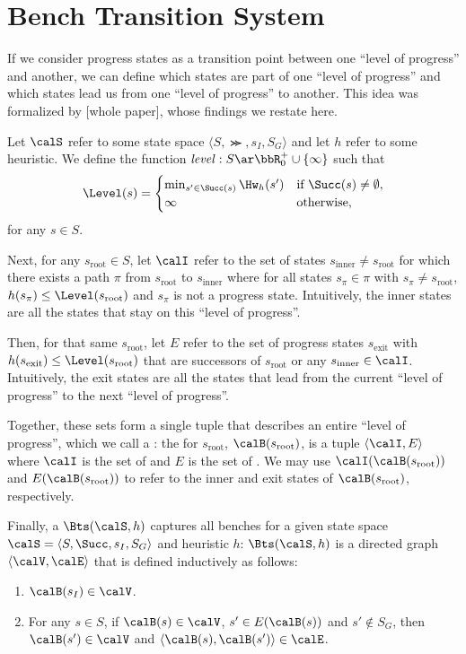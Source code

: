 \section{Bench Transition System}

If we consider progress states as a transition point between one ``level of progress'' and another, we can define which states are part of one ``level of progress'' and which states lead us from one ``level of progress'' to another. This idea was formalized by [whole paper], whose findings we restate here.

Let $\calS$ refer to some state space $\langle S,\Succ,s_I,S_G\rangle$ and let $h$ refer to some heuristic. We define the function $\mathit{level}:S\ar\bbR_0^+\cup\{\infty\}$ such that $$\Level(s)=\begin{cases}\min_{s'\in\Succ(s)}\Hw_h(s')&\text{if }\Succ(s)\neq\emptyset,\\\infty&\text{otherwise,}\end{cases}$$ for any $s\in S$.

Next, for any $s_\text{root}\in S$, let $\calI$ refer to the set of states $s_\text{inner}\neq s_\text{root}$ for which there exists a path $\pi$ from $s_\text{root}$ to $s_\text{inner}$ where for all states $s_\pi\in\pi$ with $s_\pi\neq s_\text{root}$, $h(s_\pi)\leq\Level(s_\text{root})$ and $s_\pi$ is not a progress state. Intuitively, the inner states are all the states that stay on this ``level of progress''.

Then, for that same $s_\text{root}$, let $E$ refer to the set of progress states $s_\text{exit}$ with $h(s_\text{exit})\leq\Level(s_\text{root})$ that are successors of $s_\text{root}$ or any $s_\text{inner}\in\calI$. Intuitively, the exit states are all the states that lead from the current ``level of progress'' to the next ``level of progress''.

Together, these sets form a single tuple that describes an entire ``level of progress'', which we call a : the  for $s_\text{root}$, $\calB(s_\text{root})$, is a tuple $\langle\calI,E\rangle$ where $\calI$ is the set of  and $E$ is the set of . We may use $\calI(\calB(s_\text{root}))$ and $E(\calB(s_\text{root}))$ to refer to the inner and exit states of $\calB(s_\text{root})$, respectively.

Finally, a  $\Bts(\calS,h)$ captures all benches for a given state space $\calS=\langle S,\Succ,s_I,S_G\rangle$ and heuristic $h$: $\Bts(\calS,h)$ is a directed graph $\langle \calV,\calE\rangle$ that is defined inductively as follows:
\begin{enumerate}
    \item $\calB(s_I)\in\calV$.
    \item For any $s\in S$, if $\calB(s)\in\calV$, $s'\in E(\calB(s))$ and $s'\notin S_G$, then $\calB(s')\in\calV$ and $\langle\calB(s),\calB(s')\rangle\in\calE$.
\end{enumerate}

